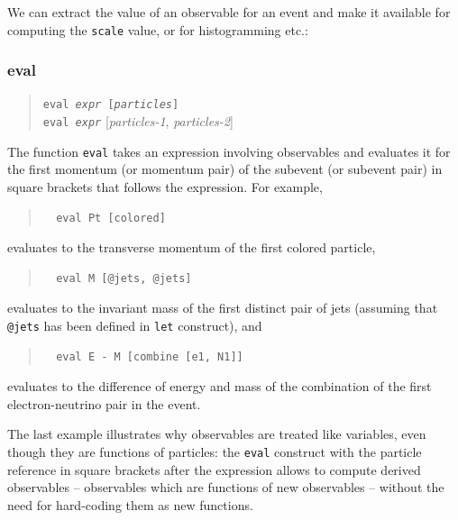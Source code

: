 \documentclass[12pt]{book}
\newcommand{\ttt}[1]{\texttt{#1}}
\begin{document}
We can extract the value of an observable for an event and make it available
for computing the \ttt{scale} value, or for histogramming etc.:

\subsubsection{eval}
\begin{quote}
\begin{footnotesize}
  \ttt{eval \textit{expr} [\textit{particles}]} \\
  \ttt{eval \textit{expr}} [\textit{particles-1}, \textit{particles-2}]
\end{footnotesize}
\end{quote}

The function \ttt{eval} takes an expression involving observables and
evaluates it for the first momentum (or momentum pair) of the subevent (or
subevent pair) in square brackets that follows the expression.  For example,
\begin{quote}
\begin{footnotesize}
\begin{verbatim}
  eval Pt [colored]
\end{verbatim}
\end{footnotesize}
\end{quote}
evaluates to the transverse momentum of the first colored particle,
\begin{quote}
\begin{footnotesize}
\begin{verbatim}
  eval M [@jets, @jets]
\end{verbatim}
\end{footnotesize}
\end{quote}
evaluates to the invariant mass of the first distinct pair of jets (assuming
that \verb|@jets| has been defined in \ttt{let} construct), and
\begin{quote}
\begin{footnotesize}
\begin{verbatim}
  eval E - M [combine [e1, N1]]
\end{verbatim}
\end{footnotesize}
\end{quote}
evaluates to the difference of energy and mass of the combination of the first
electron-neutrino pair in the event.

The last example illustrates why observables are treated like variables, even
though they are functions of particles: the \ttt{eval} construct with the
particle reference in square brackets after the expression allows to compute
derived observables -- observables which are functions of new observables --
without the need for hard-coding them as new functions.
\end{document}

